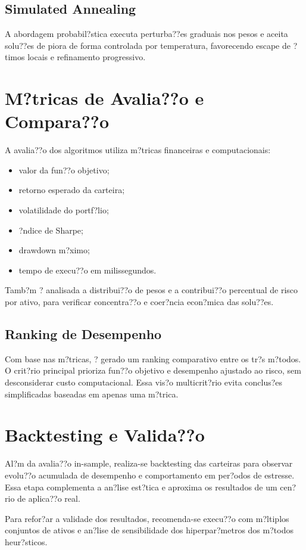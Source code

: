 ﻿\documentclass[
  12pt,
  oneside,
  a4paper,
  brazil
]{abntex2}
\begin{document}
\subsection{Simulated Annealing}
A abordagem probabil?stica executa perturba??es graduais nos pesos e aceita solu??es de piora de forma controlada por temperatura, favorecendo escape de ?timos locais e refinamento progressivo.

\section{M?tricas de Avalia??o e Compara??o}
A avalia??o dos algoritmos utiliza m?tricas financeiras e computacionais:
\begin{itemize}
  \item valor da fun??o objetivo;
  \item retorno esperado da carteira;
  \item volatilidade do portf?lio;
  \item ?ndice de Sharpe;
  \item drawdown m?ximo;
  \item tempo de execu??o em milissegundos.
\end{itemize}

Tamb?m ? analisada a distribui??o de pesos e a contribui??o percentual de risco por ativo, para verificar concentra??o e coer?ncia econ?mica das solu??es.

\subsection{Ranking de Desempenho}
Com base nas m?tricas, ? gerado um ranking comparativo entre os tr?s m?todos. O crit?rio principal prioriza fun??o objetivo e desempenho ajustado ao risco, sem desconsiderar custo computacional. Essa vis?o multicrit?rio evita conclus?es simplificadas baseadas em apenas uma m?trica.

\section{Backtesting e Valida??o}
Al?m da avalia??o in-sample, realiza-se backtesting das carteiras para observar evolu??o acumulada de desempenho e comportamento em per?odos de estresse. Essa etapa complementa a an?lise est?tica e aproxima os resultados de um cen?rio de aplica??o real.

Para refor?ar a validade dos resultados, recomenda-se execu??o com m?ltiplos conjuntos de ativos e an?lise de sensibilidade dos hiperpar?metros dos m?todos heur?sticos.
\end{document}
